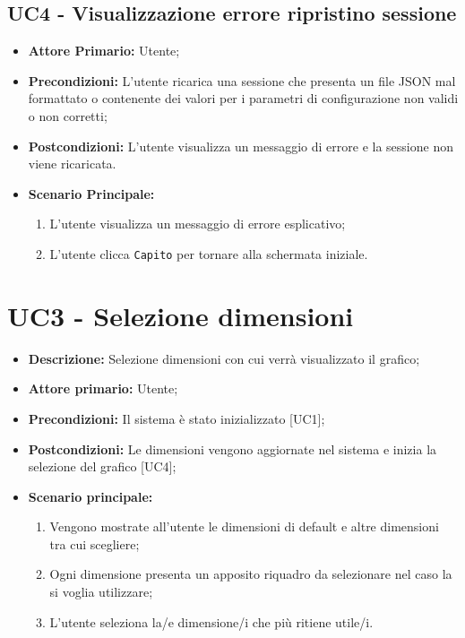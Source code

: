 \subsection{UC4 - Visualizzazione errore ripristino sessione}
\begin{itemize}
  \item \textbf{Attore Primario:} Utente;
  \item \textbf{Precondizioni:} L'utente ricarica una sessione che presenta un file JSON mal formattato o contenente dei valori per i parametri di configurazione non validi o non corretti;
  \item \textbf{Postcondizioni:} L'utente visualizza un messaggio di errore e la sessione non viene ricaricata.
  \item \textbf{Scenario Principale:}
  \begin{enumerate}
    \item L'utente visualizza un messaggio di errore esplicativo;
    \item L'utente clicca \texttt{Capito} per tornare alla schermata iniziale.
  \end{enumerate}
\end{itemize}


\section{UC3 - Selezione dimensioni}
 \begin{itemize}
     \item \textbf{Descrizione:} Selezione dimensioni con cui verrà visualizzato il grafico;
     \item \textbf{Attore primario:} Utente;
     \item \textbf{Precondizioni:} Il sistema è stato inizializzato [UC1];
     \item \textbf{Postcondizioni:} Le dimensioni vengono aggiornate nel sistema e inizia la selezione del grafico [UC4];
     \item \textbf{Scenario principale:}
     \begin{enumerate}
         \item Vengono mostrate all'utente le dimensioni di default e altre dimensioni tra cui scegliere;
         \item Ogni dimensione presenta un apposito riquadro da selezionare nel caso la si voglia utilizzare;
         \item L'utente seleziona la/e dimensione/i che più ritiene utile/i.
     \end{enumerate}
 \end{itemize}


